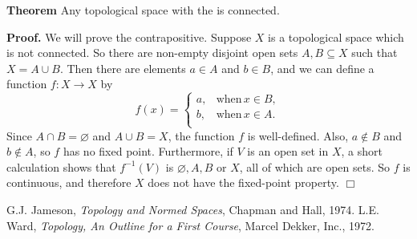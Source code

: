 \documentclass[12pt]{article}
\renewcommand{\emptyset}{\varnothing}
\begin{document}

{\bf Theorem}
Any topological space with the  is connected.

{\bf Proof.}
We will prove the contrapositive.
Suppose $X$ is a topological space which is not connected.
So there are non-empty disjoint open sets $A,B\subseteq X$ such
that $X=A\cup B$. Then there are elements $a\in A$ and $b\in B$, and
we can define a function $f\colon X\to X$ by
$$ f(x) = \left\{ \begin {array}{ll} a, & \mbox{when} \, x\in B, \\
 b, & \mbox{when} \, x\in A. \\
 \end{array} \right. $$
Since $A\cap B=\emptyset$ and $A\cup B=X$, the function $f$ is well-defined.
Also, $a\notin B$ and $b\notin A$, so $f$ has no fixed point.
Furthermore, if $V$ is an open set in $X$, a short calculation shows that
$f^{-1}(V)$ is $\emptyset, A,B$ or $X$, all of which are open sets.
So $f$ is continuous, and therefore $X$ does not have the fixed-point property.
$\Box$

\begin{thebibliography}{9}
  G.J. Jameson, \emph{Topology and Normed Spaces},
 Chapman and Hall, 1974.
 L.E. Ward, \emph{Topology, An Outline for a First Course},
Marcel Dekker, Inc., 1972.
 \end{thebibliography}
\end{document}
